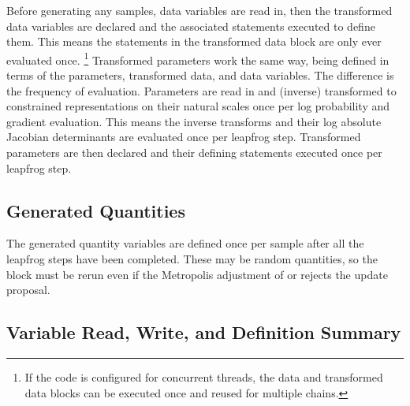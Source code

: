 Before generating any samples, data variables are read in, then the
transformed data variables are declared and the associated statements
executed to define them.  This means the statements in the transformed
data block are only ever evaluated once.%
%
\footnote{If the \Cpp code is configured for concurrent threads, the
  data and transformed data blocks can be executed once and reused for
  multiple chains.}
%
Transformed parameters work the same way, being defined in terms of
the parameters, transformed data, and data variables.  The difference
is the frequency of evaluation.  Parameters are read in and (inverse)
transformed to constrained representations on their natural scales
once per log probability and gradient evaluation.  This means the
inverse transforms and their log absolute Jacobian determinants are
evaluated once per leapfrog step.  Transformed parameters are then
declared and their defining statements executed once per leapfrog
step.

\subsection{Generated Quantities}

The generated quantity variables are defined once per sample after all
the leapfrog steps have been completed.  These may be random
quantities, so the block must be rerun even if the Metropolis
adjustment of \HMC or \NUTS rejects the update proposal.  


\subsection{Variable Read, Write, and Definition Summary}

